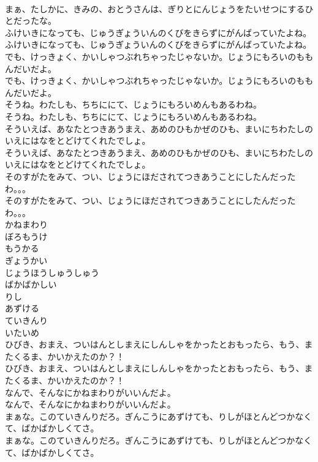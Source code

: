 \documentclass[8pt]{extreport}
\begin{document}
\begin{CJK}{UTF8}{min}
\\	まぁ、たしかに、きみの、おとうさんは、ぎりとにんじょうをたいせつにするひとだったな。 
\\	ふけいきになっても、じゅうぎょういんのくびをきらずにがんばっていたよね。	
\\	ふけいきになっても、じゅうぎょういんのくびをきらずにがんばっていたよね。 
\\	でも、けっきょく、かいしゃつぶれちゃったじゃないか。じょうにもろいのももんだいだよ。	
\\	でも、けっきょく、かいしゃつぶれちゃったじゃないか。じょうにもろいのももんだいだよ。 
\\	そうね。わたしも、ちちににて、じょうにもろいめんもあるわね。	
\\	そうね。わたしも、ちちににて、じょうにもろいめんもあるわね。 
\\	そういえば、あなたとつきあうまえ、あめのひもかぜのひも、まいにちわたしのいえにはなをとどけてくれたでしょ。	
\\	そういえば、あなたとつきあうまえ、あめのひもかぜのひも、まいにちわたしのいえにはなをとどけてくれたでしょ。 
\\	そのすがたをみて、つい、じょうにほだされてつきあうことにしたんだったわ。。。	
\\	そのすがたをみて、つい、じょうにほだされてつきあうことにしたんだったわ。。。 
\\	かねまわり
\\	ぼろもうけ
\\	もうかる
\\	ぎょうかい
\\	じょうほうしゅうしゅう
\\	ばかばかしい
\\	りし
\\	あずける
\\	ていきんり
\\	いたいめ
\\	ひびき、おまえ、ついはんとしまえにしんしゃをかったとおもったら、もう、またくるま、かいかえたのか？！	
\\	ひびき、おまえ、ついはんとしまえにしんしゃをかったとおもったら、もう、またくるま、かいかえたのか？！ 
\\	なんで、そんなにかねまわりがいいんだよ。	
\\	なんで、そんなにかねまわりがいいんだよ。 
\\	まぁな。このていきんりだろ。ぎんこうにあずけても、りしがほとんどつかなくて、ばかばかしくてさ。	
\\	まぁな。このていきんりだろ。ぎんこうにあずけても、りしがほとんどつかなくて、ばかばかしくてさ。 

\end{CJK}
\end{document}
